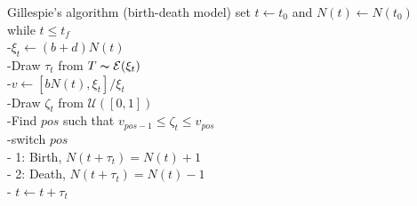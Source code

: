\documentclass[aspectratio=169]{beamer}\usepackage[]{graphicx}\usepackage[]{xcolor}
\begin{document}
\begin{frame}{Gillespie's algorithm (birth-death model)}
set $t\leftarrow t_0$ and $N(t)\leftarrow N(t_0)$\\
while {$t\leq t_f$}\\
-\qquad $\xi_t\leftarrow (b+d)N(t)$\\
-\qquad Draw $\tau_t$ from $T\thicksim \mathcal{E}(\xi_t)$\\
-\qquad $v\leftarrow\left[bN(t),\xi_t\right]/\xi_t$\\
-\qquad Draw $\zeta_t$ from $\mathcal{U}([0,1])$\\
-\qquad Find $pos$ such that $v_{pos-1}\leq\zeta_t\leq v_{pos}$\\
-\qquad switch {$pos$}\\
\qquad\qquad - 1: Birth, $N(t+\tau_t)=N(t)+1$ \\
\qquad\qquad - 2: Death, $N(t+\tau_t)=N(t)-1$ \\
- $t\leftarrow t+\tau_t$    
\end{frame}
\end{document}
